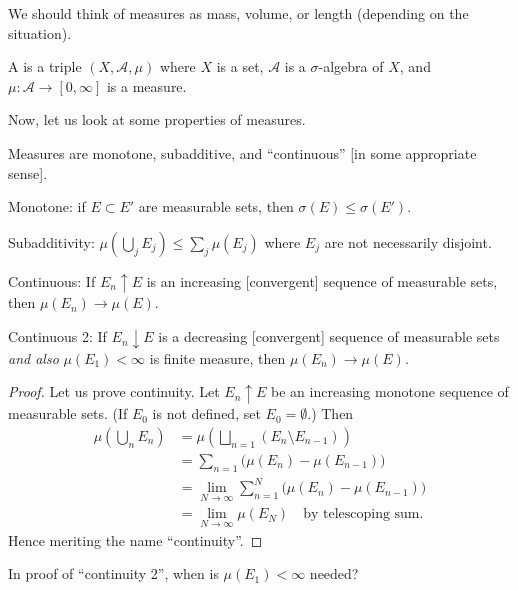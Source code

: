 \begin{node}
We should think of measures as mass, volume, or length (depending on
the situation).
\end{node}

\begin{definition}
A  is a triple $(X,\mathcal{A},\mu)$ where $X$
is a set, $\mathcal{A}$ is a $\sigma$-algebra of $X$, and
$\mu\colon\mathcal{A}\to[0,\infty]$ is a measure.
\end{definition}

Now, let us look at some properties of measures.

\begin{proposition}
Measures are monotone, subadditive, and ``continuous'' [in some
  appropriate sense].

Monotone: if $E\subset E'$ are measurable sets, then $\sigma(E)\leq\sigma(E')$.

Subadditivity: $\mu(\bigcup_{j}E_{j})\leq\sum_{j}\mu(E_{j})$ where
$E_{j}$ are not necessarily disjoint.

Continuous: If $E_{n}\uparrow E$ is an increasing [convergent] sequence of
measurable sets, then $\mu(E_{n})\to\mu(E)$.

Continuous 2: If $E_{n}\downarrow E$ is a decreasing [convergent]
sequence of measurable sets \emph{and also} $\mu(E_{1})<\infty$ is
finite measure, then $\mu(E_{n})\to\mu(E)$.
\end{proposition}

\begin{proof}
Let us prove continuity. Let $E_{n}\uparrow E$ be an increasing
monotone sequence of measurable sets. (If $E_{0}$ is not defined, set $E_{0}=\emptyset$.) Then
\begin{subequations}
  \begin{align}
\mu\left(\bigcup_{n}E_{n}\right) &= \mu\left(\bigsqcup_{n=1}(E_{n}\setminus E_{n-1})\right)\\
&= \sum_{n=1}\bigl(\mu(E_{n})-\mu(E_{n-1})\bigr)\\
&=\lim_{N\to\infty}\sum^{N}_{n=1}\bigl(\mu(E_{n})-\mu(E_{n-1})\bigr)\\
&=\lim_{N\to\infty}\mu(E_{N})\quad\mbox{by telescoping sum}.
  \end{align}
\end{subequations}
Hence meriting the name ``continuity''.
\end{proof}

\begin{puzzle}
In proof of ``continuity 2'', when is $\mu(E_{1})<\infty$ needed?
\end{puzzle}

